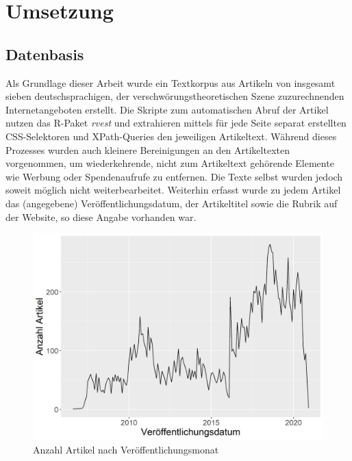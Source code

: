 \section{Umsetzung}

\subsection{Datenbasis}

Als Grundlage dieser Arbeit wurde ein Textkorpus aus Artikeln von insgesamt sieben deutschsprachigen, der verschwörungstheoretischen Szene zuzurechnenden Internetangeboten erstellt.
Die Skripte zum automatischen Abruf der Artikel nutzen das R-Paket \textit{rvest} \parencite{rvest} und extrahieren mittels für jede Seite separat erstellten CSS-Selektoren und XPath-Queries den jeweiligen Artikeltext.
Während dieses Prozesses wurden auch kleinere Bereinigungen an den Artikeltexten vorgenommen, um wiederkehrende, nicht zum Artikeltext gehörende Elemente wie Werbung oder Spendenaufrufe zu entfernen.
Die Texte selbst wurden jedoch soweit möglich nicht weiterbearbeitet.
Weiterhin erfasst wurde zu jedem Artikel das (angegebene) Veröffentlichungsdatum, der Artikeltitel sowie die Rubrik auf der Website, so diese Angabe vorhanden war.

\begin{figure}[h]
    \centering
    \includegraphics[scale=0.45]{graphics/cons_freq_time.jpg}
    \caption{Anzahl Artikel nach Veröffentlichungsmonat}
    \label{article-frequency}
\end{figure}


